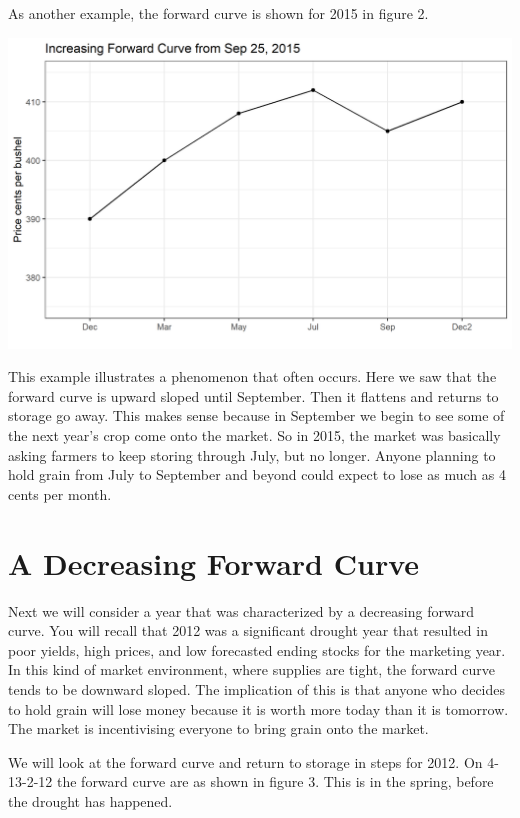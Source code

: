 \documentclass[
]{book}
\begin{document}
As another example, the forward curve is shown for 2015 in figure 2.

\includegraphics{assets/PricesSpaceTime-increasing-9-25-2015.png}

This example illustrates a phenomenon that often occurs. Here we saw that the forward curve is upward sloped until September. Then it flattens and returns to storage go away. This makes sense because in September we begin to see some of the next year's crop come onto the market. So in 2015, the market was basically asking farmers to keep storing through July, but no longer. Anyone planning to hold grain from July to September and beyond could expect to lose as much as 4 cents per month.

\hypertarget{a-decreasing-forward-curve}{%
\section{A Decreasing Forward Curve}\label{a-decreasing-forward-curve}}

Next we will consider a year that was characterized by a decreasing forward curve. You will recall that 2012 was a significant drought year that resulted in poor yields, high prices, and low forecasted ending stocks for the marketing year. In this kind of market environment, where supplies are tight, the forward curve tends to be downward sloped. The implication of this is that anyone who decides to hold grain will lose money because it is worth more today than it is tomorrow. The market is incentivising everyone to bring grain onto the market.

We will look at the forward curve and return to storage in steps for 2012. On 4-13-2-12 the forward curve are as shown in figure 3. This is in the spring, before the drought has happened.
\end{document}

